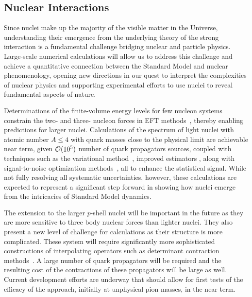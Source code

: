 \subsection{Nuclear Interactions}

Since nuclei make up the majority of the visible matter in the Universe, understanding their emergence from the underlying theory of the strong interaction is a fundamental challenge bridging nuclear and particle physics. Large-scale numerical calculations will allow us to address this challenge and achieve a quantitative connection between the Standard Model and nuclear phenomenology, opening new directions in our quest to interpret the complexities of nuclear physics and supporting experimental efforts to use nuclei to reveal fundamental aspects of nature.

Determinations of the finite-volume energy levels for few nucleon systems constrain the two- and three- nucleon forces in EFT methods~\cite{Barnea:2013uqa}, thereby enabling predictions for larger nuclei. Calculations of the spectrum of light nuclei with atomic number $A\le 4$ with quark masses close to the physical limit are achievable near term, given ${\cal O}(10^5)$ number of quark propagators sources, coupled with techniques such as the variational method~\cite{Michael:1985ne}, improved estimators \cite{Beane:2014oea}, along with signal-to-noise optimization methods~\cite{Detmold:2014hla}, all to enhance the statistical signal. While not fully resolving all systematic uncertainties, however, these calculations are expected to represent a significant step forward in showing how nuclei emerge from the intricacies of Standard Model dynamics.

The extension to the larger $p$-shell nuclei will be important in the future as they are more sensitive to three body nuclear forces than lighter nuclei. They also present a new level of challenge for calculations as their structure is more complicated. These system will require significantly more sophisticated constructions of interpolating operators such as determinant contraction methods~\cite{Detmold:2012eu,Vachaspati:2014bda}. A large number of quark propagators will be required and the resulting cost of the contractions of these propagators will be large as well. Current development efforts are underway that should allow for first tests of the efficacy of the approach, initially at unphysical pion masses, in the near term.


